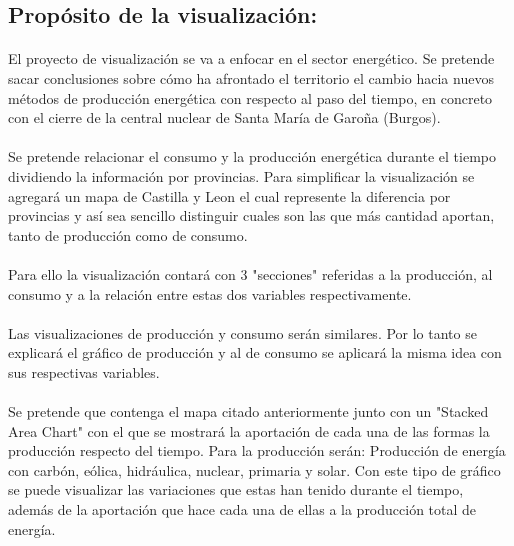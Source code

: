 \documentclass{article}
\begin{document}
		\subsection{Propósito de la visualización:}
	
			\paragraph{}
			El proyecto de visualización se va a enfocar en el sector energético. Se pretende sacar conclusiones sobre cómo ha afrontado el territorio el cambio hacia nuevos métodos de producción energética con respecto al paso del tiempo, en concreto con el cierre de la central nuclear de Santa María de Garoña (Burgos). 

			\paragraph{}
			Se pretende relacionar el consumo y la producción energética durante el tiempo dividiendo la información por provincias. Para simplificar la visualización se agregará un mapa de Castilla y Leon el cual represente la diferencia por provincias y así sea sencillo distinguir cuales son las que más cantidad aportan, tanto de producción como de consumo. 

			\paragraph{}
			Para ello la visualización contará con 3 "secciones" referidas a la producción, al consumo y a la relación entre estas dos variables respectivamente. 
			
			\paragraph{}
			Las visualizaciones de producción y consumo serán similares. Por lo tanto se explicará el gráfico de producción y al de consumo se aplicará la misma idea con sus respectivas variables.  
	
			\paragraph{}
			Se pretende que contenga el mapa citado anteriormente junto con un "Stacked Area Chart" con el que se mostrará la aportación de cada una de las formas la producción respecto del tiempo. Para la producción serán: Producción de energía con carbón, eólica, hidráulica, nuclear, primaria y solar. Con este tipo de gráfico se puede visualizar las variaciones que estas han tenido durante el tiempo, además de la aportación que hace cada una de ellas a la producción total de energía.
			
\end{document}
